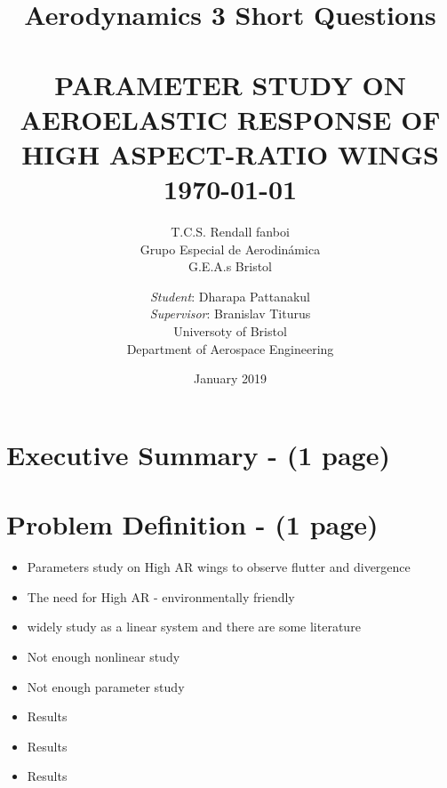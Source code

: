 \documentclass{article}
\title{Aerodynamics 3 Short Questions}
\date{January 2019}
\author{T.C.S. Rendall fanboi \Group \\ Grupo Especial de Aerodinámica \\ G.E.A.s Bristol}
\begin{document}
{\selectfont
\title{ \normalsize \textsc{}
		\\ [2.0cm]
		\HRule{0.5pt} \\
		\LARGE \textbf{\uppercase{Parameter Study on Aeroelastic Response of  High Aspect-Ratio Wings}
		\HRule{2pt} \\ [0.5cm]
		\normalsize \today \vspace*{5\baselineskip}}
		}
}

\date{}

\author{
        \textit{Student}: Dharapa Pattanakul\\ 
        \textit{Supervisor}: Branislav Titurus\\
		Universoty of Bristol \\
		Department of Aerospace Engineering }

\maketitle
\newpage
\tableofcontents
\newpage
\section{Executive Summary - (1 page)}

\section{Problem Definition - (1 page)}
\begin{itemize}
    \item Parameters study on High AR wings to observe flutter and divergence
    \item The need for High AR - environmentally friendly
    \item widely study as a linear system and there are some literature
    \item Not enough nonlinear study
    \item Not enough parameter study
    \item Results
    \item Results
    \item Results
\end{itemize}
\end{document}
